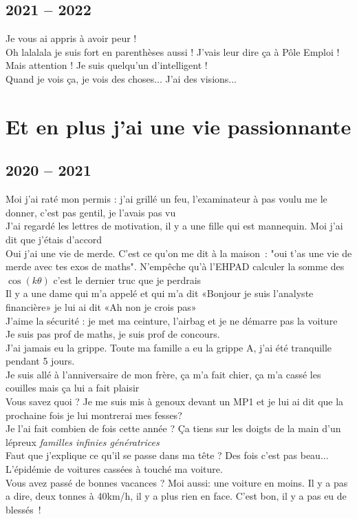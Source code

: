\documentclass[french, a4paper, openany]{book}
\begin{document}
\section{2021 -- 2022}

	\noindent \og Je vous ai appris à avoir peur ! \fg \\
	\og Oh lalalala je suis fort en parenthèses aussi ! J'vais leur dire ça à Pôle Emploi ! \fg \\
	\og Mais attention ! Je suis quelqu'un d'intelligent ! \fg \\
	\og Quand je vois ça, je vois des choses... J'ai des visions... \fg \\

\chapter{Et en plus j'ai une vie passionnante}

\section{2020 -- 2021}

	\noindent \og Moi j'ai raté mon permis : j'ai grillé un feu, l'examinateur à pas voulu me le donner, c'est pas gentil, je l'avais pas vu \fg \\
	\og J'ai regardé les lettres de motivation, il y a une fille qui est mannequin. Moi j'ai dit que j'étais d'accord \fg \\
	\og Oui j'ai une vie de merde. C'est ce qu'on me dit à la maison~: "oui t'as une vie de merde avec tes exos de maths". N'empêche qu'à l'EHPAD calculer la somme des $\cos(k \theta)$ c'est le dernier truc que je perdrais \fg \\
	\og Il y a une dame qui m'a appelé et qui m'a dit «Bonjour je suis l'analyste financière» je lui ai dit «Ah non je crois pas» \fg \\
	\og J'aime la sécurité : je met ma ceinture, l'airbag et je ne démarre pas la voiture \fg \\
	\og Je suis pas prof de maths, je suis prof de concours. \fg \\
	\og J'ai jamais eu la grippe. Toute ma famille a eu la grippe A, j'ai été tranquille pendant 5 jours. \fg \\
	\og Je suis allé à l'anniversaire de mon frère, ça m'a fait chier, ça m'a cassé les couilles mais ça lui a fait plaisir \fg \\
	\og Vous savez quoi ? Je me suis mis à genoux devant un MP1 et je lui ai dit que la prochaine fois je lui montrerai mes fesses? \fg \\
	\og Je l'ai fait combien de fois cette année ? Ça tiens sur les doigts de la main d'un lépreux \fg \emph{familles infinies génératrices} \\
	\og Faut que j'explique ce qu'il se passe dans ma tête ? Des fois c'est pas beau... \fg \\
	\og L'épidémie de voitures cassées à touché ma voiture. \fg \\
	\og Vous avez passé de bonnes vacances ? Moi aussi: une voiture en moins. Il y a pas a dire, deux tonnes à 40km/h, il y a plus rien en face. C'est bon, il y a pas eu de blessés~! \fg \\
\end{document}
